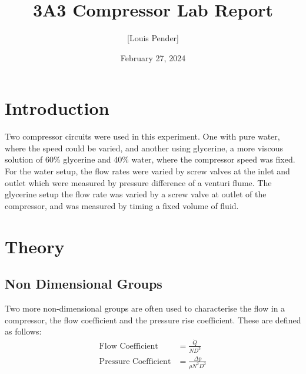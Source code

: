 \documentclass{article}
\title{3A3 Compressor Lab Report}
\author{[Louis Pender]}
\date{February 27, 2024}
\begin{document}
\maketitle

\section{Introduction}

Two compressor circuits were used in this experiment.
One with pure water, where the speed could be varied, and another using glycerine, a more viscous solution of 60\%
glycerine and 40\% water, where the compressor speed was fixed.
For the water setup, the flow rates were varied by screw valves at the inlet and outlet which were measured by pressure difference of a venturi flume.
The glycerine setup the flow rate was varied by a screw valve at outlet of the compressor, and was measured by timing a fixed volume of fluid.

\section{Theory}





\subsection{Non Dimensional Groups}


Two more non-dimensional groups are often used to characterise the flow in a compressor, the flow coefficient and the pressure rise coefficient.
These are defined as follows:
\begin{align}
    \text{Flow Coefficient} &= \frac{\dot{Q}}{ND^3} \label{eq:flow_coeff}\\
    \text{Pressure Coefficient} &= \frac{\Delta p}{\rho N^2 D^2} \label{eq:pressure_coeff}
\end{align}
\end{document}
